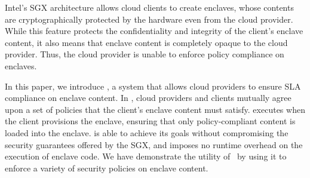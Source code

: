 \renewcommand{\baselinestretch}{0.8}
Intel's SGX architecture allows cloud clients to create enclaves, whose
contents are cryptographically protected by the hardware even from the cloud
provider. While this feature protects the confidentiality and integrity of the
client's enclave content, it also means that enclave content is completely
opaque to the cloud provider.  Thus, the cloud provider is unable to enforce
policy compliance on enclaves.

In this paper, we introduce \tool, a system that allows cloud providers to
ensure SLA compliance on enclave content. In \tool, cloud providers and clients
mutually agree upon a set of policies that the client's enclave content must
satisfy. \tool executes when the client provisions the enclave, ensuring that
only policy-compliant content is loaded into the enclave. \tool is able to
achieve its goals without compromising the security guarantees offered by the
SGX, and imposes no runtime overhead on the execution of enclave code. We have
demonstrate the utility of \tool\ by using it to enforce a variety of security
policies on enclave content.
\renewcommand{\baselinestretch}{1}

